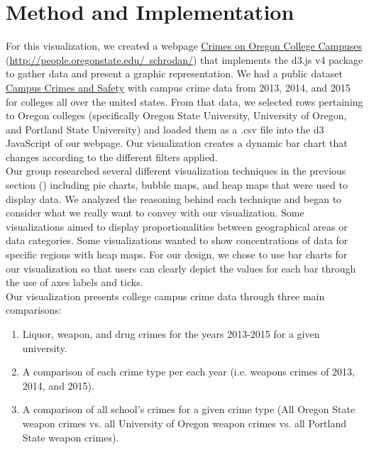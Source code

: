 \documentclass[journal]{vgtc}                %
\begin{document}
\section{Method and Implementation} \label{methods}

For this visualization, we created a webpage \href{http://people.oregonstate.edu/~schrodan/}{Crimes on Oregon College Campuses} (\href{http://people.oregonstate.edu/~schrodan/}{http://people.oregonstate.edu/~schrodan/}) that implements the d3.js v4 package to gather data and present a graphic representation. We had a public dataset \href{https://ope.ed.gov/campussafety/#/}{Campus Crimes and Safety} with campus crime data from 2013, 2014, and 2015 for colleges all over the united states. From that data, we selected rows pertaining to Oregon colleges (specifically Oregon State University, University of Oregon, and Portland State University) and loaded them as a .csv file into the d3 JavaScript of our webpage. Our visualization creates a dynamic bar chart that changes according to the different filters applied.\\
\indent Our group researched several different visualization techniques in the previous section () including pie charts, bubble maps, and heap maps that were used to display data. We analyzed the reasoning behind each technique and began to consider what we really want to convey with our visualization. Some visualizations aimed to display proportionalities between geographical areas or data categories. Some visualizations wanted to show concentrations of data for specific regions with heap maps. For our design, we chose to use bar charts for our visualization so that users can clearly depict the values for each bar through the use of axes labels and ticks.\\
\indent Our visualization presents college campus crime data through three main comparisons:
\begin{enumerate}
	\setlength\itemsep{0em}
	\item Liquor, weapon, and drug crimes for the years 2013-2015 for a given university.
	\item A comparison of each crime type per each year (i.e. weapons crimes of 2013, 2014, and 2015).
	\item A comparison of all school's crimes for a given crime type (All Oregon State weapon crimes vs. all University of Oregon weapon crimes vs. all Portland State weapon crimes).
\end{enumerate}
\end{document}
